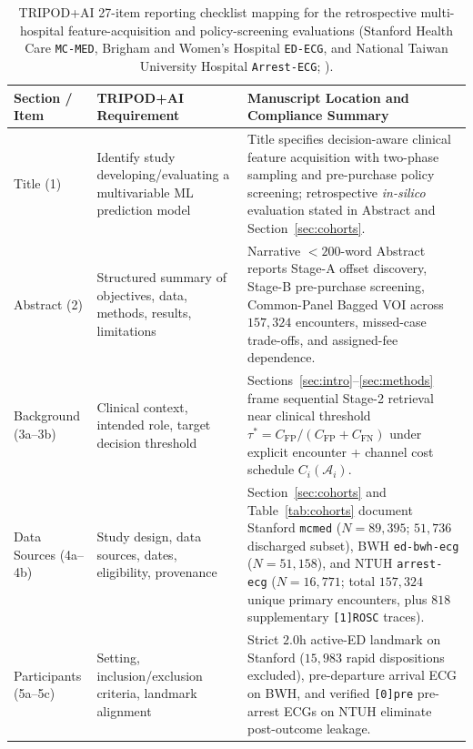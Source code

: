 \begin{table}[h!]
\centering
\caption{TRIPOD+AI 27-item reporting checklist mapping for the retrospective multi-hospital feature-acquisition and policy-screening evaluations (Stanford Health Care \texttt{MC-MED}, Brigham and Women's Hospital \texttt{ED-ECG}, and National Taiwan University Hospital \texttt{Arrest-ECG}; \citealp{collins2024tripodai}).}
\label{tab:tripod_ai}
\scriptsize
\renewcommand{\arraystretch}{1.10}
\begin{tabular}{>{\raggedright\arraybackslash}p{}>{\raggedright\arraybackslash}p{}>{\raggedright\arraybackslash}p{}}
\toprule
\textbf{Section / Item} & \textbf{TRIPOD+AI Requirement} & \textbf{Manuscript Location and Compliance Summary} \\
\midrule
Title (1) & Identify study developing/evaluating a multivariable ML prediction model & Title specifies decision-aware clinical feature acquisition with two-phase sampling and pre-purchase policy screening; retrospective \emph{in-silico} evaluation stated in Abstract and Section~\ref{sec:cohorts}. \\
Abstract (2) & Structured summary of objectives, data, methods, results, limitations & Narrative $<200$-word Abstract reports Stage-A offset discovery, Stage-B pre-purchase screening, Common-Panel Bagged VOI across $157{,}324$ encounters, missed-case trade-offs, and assigned-fee dependence. \\
Background (3a--3b) & Clinical context, intended role, target decision threshold & Sections~\ref{sec:intro}--\ref{sec:methods} frame sequential Stage-2 retrieval near clinical threshold $\tau^* = C_{\text{FP}}/(C_{\text{FP}}+C_{\text{FN}})$ under explicit encounter + channel cost schedule $C_i(\mathcal{A}_i)$. \\
Data Sources (4a--4b) & Study design, data sources, dates, eligibility, provenance & Section~\ref{sec:cohorts} and Table~\ref{tab:cohorts} document Stanford \texttt{mcmed} ($N=89{,}395$; $51{,}736$ discharged subset), BWH \texttt{ed-bwh-ecg} ($N=51{,}158$), and NTUH \texttt{arrest-ecg} ($N=16{,}771$; total $157{,}324$ unique primary encounters, plus $818$ supplementary \texttt{[1]ROSC} traces). \\
Participants (5a--5c) & Setting, inclusion/exclusion criteria, landmark alignment & Strict $2.0\text{h}$ active-ED landmark on Stanford ($15{,}983$ rapid dispositions excluded), pre-departure arrival ECG on BWH, and verified \texttt{[0]pre} pre-arrest ECGs on NTUH eliminate post-outcome leakage. \\

\end{tabular}
\end{table}
